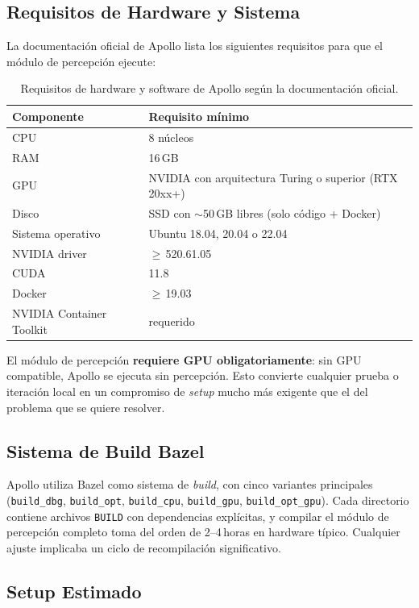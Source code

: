 \subsection{Requisitos de Hardware y Sistema}

La documentación oficial de Apollo lista los siguientes requisitos para que el módulo de percepción ejecute:

\begin{table}[H]
\centering
\begin{tabular}{|l|l|}
\hline
\textbf{Componente} & \textbf{Requisito mínimo} \\
\hline
CPU & 8 núcleos \\
RAM & 16\,GB \\
GPU & NVIDIA con arquitectura Turing o superior (RTX 20xx+) \\
Disco & SSD con $\sim$50\,GB libres (solo código + Docker) \\
Sistema operativo & Ubuntu 18.04, 20.04 o 22.04 \\
NVIDIA driver & $\geq$\,520.61.05 \\
CUDA & 11.8 \\
Docker & $\geq$\,19.03 \\
NVIDIA Container Toolkit & requerido \\
\hline
\end{tabular}
\caption{Requisitos de hardware y software de Apollo según la documentación oficial.}
\end{table}

El módulo de percepción \textbf{requiere GPU obligatoriamente}: sin GPU compatible, Apollo se ejecuta sin percepción. Esto convierte cualquier prueba o iteración local en un compromiso de \textit{setup} mucho más exigente que el del problema que se quiere resolver.

\subsection{Sistema de Build Bazel}

Apollo utiliza Bazel como sistema de \textit{build}, con cinco variantes principales (\texttt{build\_dbg}, \texttt{build\_opt}, \texttt{build\_cpu}, \texttt{build\_gpu}, \texttt{build\_opt\_gpu}). Cada directorio contiene archivos \texttt{BUILD} con dependencias explícitas, y compilar el módulo de percepción completo toma del orden de 2--4\,horas en hardware típico. Cualquier ajuste implicaba un ciclo de recompilación significativo.

\subsection{Setup Estimado}

